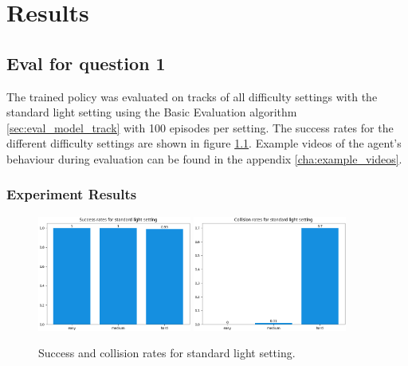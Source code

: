 \chapter{Results}
\label{cha:Results}


\section{Eval for question 1}

The trained policy was evaluated on tracks of all difficulty settings with the standard light setting using the Basic Evaluation algorithm \ref{sec:eval_model_track} with 100 episodes per setting. The success rates for the different difficulty settings are shown in figure \ref{fig:result_success_rates_standard}. Example videos of the agent's behaviour during evaluation can be found in the appendix \ref{cha:example_videos}.

\subsection{Experiment Results}

\begin{figure}
    \centering
    \includegraphics[width=0.45\textwidth]{Bilder/notebook_images/hardDistanceMixedLight_eval_standard_success_rates_barplot.png}
    \includegraphics[width=0.45\textwidth]{Bilder/notebook_images/hardDistanceMixedLight_eval_standard_collision_rates_barplot.png}
    \caption{Success and collision rates for standard light setting.}
    \label{fig:result_success_rates_standard}
\end{figure}


